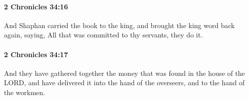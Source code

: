 		\paragraph{2 Chronicles 34:16} %
			\label{2CHRONICLES-34-16}

			And Shaphan carried the book to the king, and brought the king word back again, saying, All that was committed to thy servants, they do it.


		\paragraph{2 Chronicles 34:17} %
			\label{2CHRONICLES-34-17}

			And they have gathered together the money that was found in the house of the LORD, and have delivered it into the hand of the overseers, and to the hand of the workmen.


